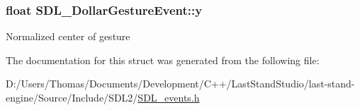 \subsubsection[{y}]{\setlength{\rightskip}{0pt plus 5cm}float S\+D\+L\+\_\+\+Dollar\+Gesture\+Event\+::y}\label{structSDL__DollarGestureEvent_a293b2303acc1cfc63c167c5525e6eab5}
Normalized center of gesture 

The documentation for this struct was generated from the following file\+:\begin{DoxyCompactItemize}
\item 
D\+:/\+Users/\+Thomas/\+Documents/\+Development/\+C++/\+Last\+Stand\+Studio/last-\/stand-\/engine/\+Source/\+Include/\+S\+D\+L2/\hyperlink{SDL__events_8h}{S\+D\+L\+\_\+events.\+h}\end{DoxyCompactItemize}
